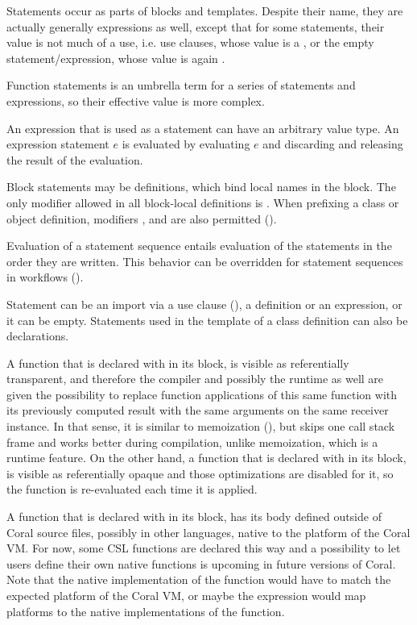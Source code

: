Statements occur as parts of blocks and templates. Despite their name, they are actually generally expressions as well, except that for some statements, their value is not much of a use, i.e. use clauses, whose value is a , or the empty statement/expression, whose value is again . 

Function statements is an umbrella term for a series of statements and expressions, so their effective value is more complex. 

An expression that is used as a statement can have an arbitrary value type. An expression statement $e$ is evaluated by evaluating $e$ and discarding and releasing the result of the evaluation. 

Block statements may be definitions, which bind local names in the block. The only modifier allowed in all block-local definitions is . When prefixing a class or object definition, modifiers ,  and  are also permitted ().

Evaluation of a statement sequence entails evaluation of the statements in the order they are written. This behavior can be overridden for statement sequences in workflows ().

Statement can be an import via a use clause (), a definition or an expression, or it can be empty. Statements used in the template of a class definition can also be declarations. 

A function that is declared with  in its  block, is visible as referentially transparent, and therefore the compiler and possibly the runtime as well are given the possibility to replace function applications of this same function with its previously computed result with the same arguments on the same receiver instance. In that sense, it is similar to memoization (), but skips one call stack frame and works better during compilation, unlike memoization, which is a runtime feature. On the other hand, a function that is declared with  in its  block, is visible as referentially opaque and those optimizations are disabled for it, so the function is re-evaluated each time it is applied. 

A function that is declared with  in its  block, has its body defined outside of Coral source files, possibly in other languages, native to the platform of the Coral VM. For now, some CSL functions are declared this way and a possibility to let users define their own native functions is upcoming in future versions of Coral. Note that the native implementation of the function would have to match the expected platform of the Coral VM, or maybe the expression would map platforms to the native implementations of the function. 

